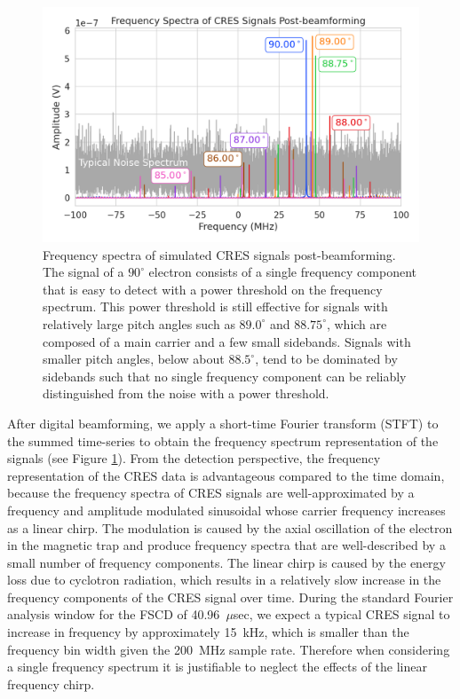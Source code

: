 \begin{figure}[ht]
    \centering
    \includegraphics[width=.7\textwidth]{figs/Chapter-4/230313_cres_signal_post_bf_examples.png}
    \caption{Frequency spectra of simulated CRES signals post-beamforming. The signal of a $90^\circ$ electron consists of a single frequency component that is easy to detect with a power threshold on the frequency spectrum. This power threshold is still effective for signals with relatively large pitch angles such as $89.0^\circ$ and $88.75^\circ$, which are composed of a main carrier and a few small sidebands. Signals with smaller pitch angles, below about $88.5^\circ$, tend to be dominated by sidebands such that no single frequency component can be reliably distinguished from the noise with a power threshold.
    }
    \label{fig:signal_post_bf_example}
\end{figure}

After digital beamforming, we apply a short-time Fourier transform (STFT) to the summed time-series to obtain the frequency spectrum representation of the signals (see Figure \ref{fig:signal_post_bf_example}). From the detection perspective, the frequency representation of the CRES data is advantageous compared to the time domain, because the frequency spectra of CRES signals are well-approximated by a frequency and amplitude modulated sinusoidal whose carrier frequency increases as a linear chirp. The modulation is caused by the axial oscillation of the electron in the magnetic trap and produce frequency spectra that are well-described by a small number of frequency components. The linear chirp is caused by the energy loss due to cyclotron radiation, which results in a relatively slow increase in the frequency components of the CRES signal over time. During the standard Fourier analysis window for the FSCD of 40.96~$\mu$sec, we expect a typical CRES signal to increase in frequency by approximately 15~kHz, which is smaller than the frequency bin width given the 200~MHz sample rate. Therefore when considering a single frequency spectrum it is justifiable to neglect the effects of the linear frequency chirp. 

